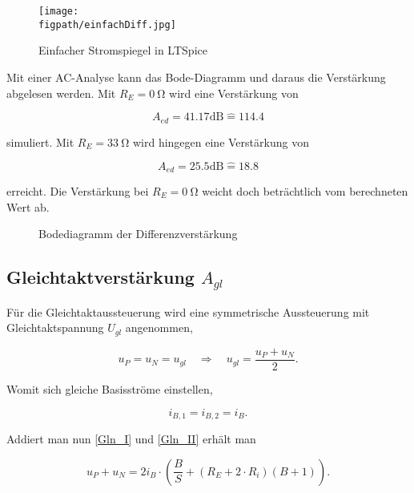 \begin{figure}[H]
    \centering
    \texttt{[image: \\figpath/einfachDiff.jpg]}
    \caption{Einfacher Stromspiegel in LTSpice}
    \label{fig_Kap5_03:SpiceSchematic}
\end{figure}

Mit einer AC-Analyse kann das Bode-Diagramm und daraus die Verstärkung abgelesen werden. Mit $R_E = \SI{0}{\ohm}$ wird eine Verstärkung von 

\begin{equation}
    A_{ed} = 41.17\text{dB} \hat{=} 114.4
\end{equation}

simuliert. Mit $R_E = \SI{33}{\ohm}$ wird hingegen eine Verstärkung von 

\begin{equation}
    A_{ed} = 25.5\text{dB} \hat{=} 18.8
\end{equation}

erreicht. Die Verstärkung bei $R_E = \SI{0}{\ohm}$ weicht doch beträchtlich vom berechneten Wert ab.

\begin{figure}[H]
	\centering \small
	\scalebox{0.9}{}
	\caption{Bodediagramm der Differenzverstärkung}
	\label{fig_Kap5_04:Bode}
\end{figure}

\subsection{Gleichtaktverstärkung $A_{gl}$}
Für die Gleichtaktaussteuerung wird eine symmetrische Aussteuerung mit Gleichtaktspannung $U_{gl}$ angenommen, 

\begin{equation}
    u_P = u_N = u_{gl} \quad \Rightarrow \quad u_{gl} = \frac{u_P + u_N}{2} .
\end{equation}

Womit sich gleiche Basisströme einstellen,

\begin{equation}
    i_{B,1} = i_{B,2} = i_{B} .
\end{equation}

Addiert man nun \ref{Gln_I} und \ref{Gln_II} erhält man

\begin{equation}
    u_P + u_N = 2 i_B \cdot \left( \frac{B}{S} + (R_E + 2 \cdot R_i)(B+1) \right) .
\end{equation}

